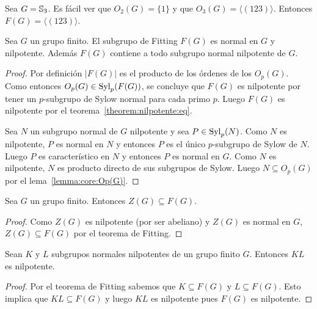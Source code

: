 \begin{example}
	Sea $G=\mathbb{S}_3$. Es fácil ver que $O_2(G)=\{1\}$ y que $O_3(G)=\langle
	(123)\rangle$. Entonces $F(G)=\langle (123)\rangle$.
\end{example}

\begin{theorem}[Fitting]
	\label{theorem:Fitting}
	Sea $G$ un grupo finito. El subgrupo de Fitting $F(G)$ es normal en $G$ y
	nilpotente. Además $F(G)$ contiene a todo subgrupo normal nilpotente de
	$G$.
\end{theorem}

\begin{proof}
	Por definición $|F(G)|$ es el producto de los órdenes de los $O_p(G)$.
	Como entonces $O_p(G)\in\mathrm{Syl}_p(F(G))$,  se concluye que $F(G)$ es
	nilpotente por tener un $p$-subgrupo de Sylow normal para cada primo $p$.
	Luego $F(G)$ es nilpotente por el teorema~\ref{theorem:nilpotente:eq}.

	Sea $N$ un subgrupo normal de $G$ nilpotente y sea $P\in\mathrm{Syl}_p(N)$. Como
	$N$ es nilpotente, $P$ es normal en $N$ y entonces $P$ es el único
	$p$-subgrupo de Sylow de $N$. Luego $P$ es característico en $N$ y entonces
	$P$ es normal en $G$. Como $N$ es nilpotente, $N$ es producto directo de
	sus subgrupos de Sylow. Luego $N\subseteq O_p(G)$ por el
	lema~\ref{lemma:core:Op(G)}.
\end{proof}

\begin{corollary}
	\label{corollary:Z(G)subsetF(G)}
	Sea $G$ un grupo finito. Entonces $Z(G)\subseteq F(G)$.
\end{corollary}

\begin{proof}
	Como $Z(G)$ es nilpotente (por ser abeliano) y $Z(G)$ es normal en $G$,
	$Z(G)\subseteq F(G)$ por el teorema de Fitting. 
\end{proof}

\begin{corollary}[Fitting]
	\label{corollary:Fitting}
	Sean $K$ y $L$ subgrupos normales nilpotentes de un grupo finito $G$.
	Entonces $KL$ es nilpotente.
\end{corollary}

\begin{proof}
	Por el teorema de Fitting sabemos que $K\subseteq F(G)$ y
	$L\subseteq F(G)$. Esto implica que $KL\subseteq F(G)$ y luego $KL$ es
	nilpotente pues $F(G)$ es nilpotente.
\end{proof}

